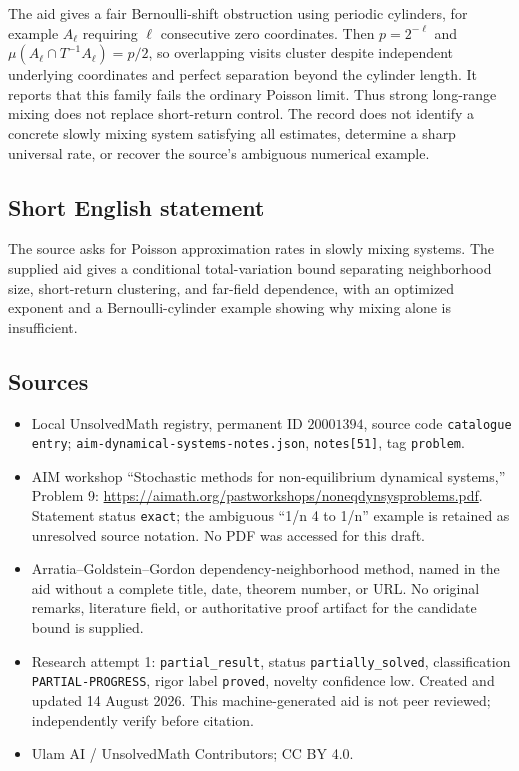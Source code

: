 \documentclass[11pt]{article}
\begin{document}
The aid gives a fair Bernoulli-shift obstruction using periodic cylinders, for example \(A_\ell\) requiring \(\ell\) consecutive zero coordinates. Then \(p=2^{-\ell}\) and \(\mu(A_\ell\cap T^{-1}A_\ell)=p/2\), so overlapping visits cluster despite independent underlying coordinates and perfect separation beyond the cylinder length. It reports that this family fails the ordinary Poisson limit. Thus strong long-range mixing does not replace short-return control. The record does not identify a concrete slowly mixing system satisfying all estimates, determine a sharp universal rate, or recover the source's ambiguous numerical example.
\subsection{Short English statement}
The source asks for Poisson approximation rates in slowly mixing systems. The supplied aid gives a conditional total-variation bound separating neighborhood size, short-return clustering, and far-field dependence, with an optimized exponent and a Bernoulli-cylinder example showing why mixing alone is insufficient.
\subsection{Sources}
\begin{itemize}
\item Local UnsolvedMath registry, permanent ID \(20001394\), source code \texttt{catalogue entry}; \texttt{aim-dynamical-systems-notes.json}, \texttt{notes[51]}, tag \texttt{problem}.
\item AIM workshop ``Stochastic methods for non-equilibrium dynamical systems,'' Problem 9: \url{https://aimath.org/pastworkshops/noneqdynsysproblems.pdf}. Statement status \texttt{exact}; the ambiguous ``1/n 4 to 1/n'' example is retained as unresolved source notation. No PDF was accessed for this draft.
\item Arratia--Goldstein--Gordon dependency-neighborhood method, named in the aid without a complete title, date, theorem number, or URL. No original remarks, literature field, or authoritative proof artifact for the candidate bound is supplied.
\item Research attempt 1: \texttt{partial\_result}, status \texttt{partially\_solved}, classification \texttt{PARTIAL-PROGRESS}, rigor label \texttt{proved}, novelty confidence low. Created and updated 14 August 2026. This machine-generated aid is not peer reviewed; independently verify before citation.
\item Ulam AI / UnsolvedMath Contributors; CC BY 4.0.
\end{itemize}
\end{document}
